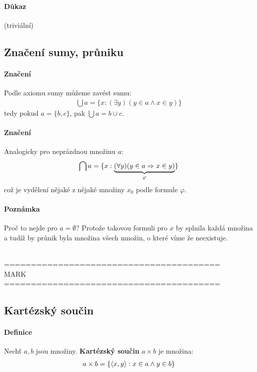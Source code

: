 \documentclass[a4paper,12pt,titlepage]{article}
\begin{document}
\paragraph{Důkaz} (triviální)
\subsection{Značení sumy, průniku}
\paragraph{Značení}
Podle axiomu sumy můžeme zavést sumu:
\begin{align}
	\bigcup a = \{ x : (\exists y) (y \in a \land x \in y) \}
\end{align}
tedy pokud $a = \{b,c\}$, pak $\bigcup a = b \cup c$.
\paragraph{Značení}
Analogicky pro neprázdnou množinu $a$:
\begin{align}
	\bigcap a = \{ x : \underbrace{(\forall y) (y \in a \Rightarrow x \in 
	y)}_\varphi\}
\end{align}
což je vydělení nějaké z nějaké množiny $x_0$ podle formule $\varphi$.
\paragraph{Poznámka}
Proč to nejde pro $a = \emptyset$? Protože takovou formuli pro $x$ by splnila 
každá množina a tudíž by průnik byla množina všech množin, o které víme že 
neexistuje.

\ \\
========================================\\
MARK\\
========================================



\subsection{Kartézský součin}
\setcounter{equation}{0}
\paragraph{Definice}
Nechť $a,b$ jsou množiny. \textbf{Kartézský součin} $a \times b$ je množina:
\begin{align}
	a \times b = \left\{ \langle x,y \rangle : x \in a \land y \in b \right\}
\end{align}
\end{document}
